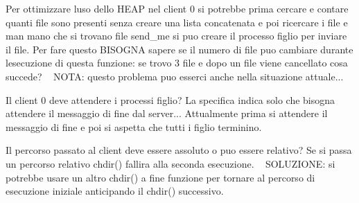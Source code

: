 
\begin{DoxyRefList}
\item[\label{warning__warning000001}%
\Hypertarget{warning__warning000001}%
Globale \hyperlink{client_8h_a8c7084a254c7cd640d66e647795ff8f6}{operazioni\+\_\+client0} ()]Per ottimizzare l\textquotesingle{}uso dello H\+E\+AP nel client 0 si potrebbe prima cercare e contare quanti file sono presenti senza creare una lista concatenata e poi ricercare i file e man mano che si trovano file send\+\_\+me si puo\textquotesingle{} creare il processo figlio per inviare il file. Per fare questo B\+I\+S\+O\+G\+NA sapere se il numero di file puo\textquotesingle{} cambiare durante l\textquotesingle{}esecuzione di questa funzione\+: se trovo 3 file e dopo un file viene cancellato cosa succede? ~\newline
 N\+O\+TA\+: questo problema puo\textquotesingle{} esserci anche nella situazione attuale...

Il client 0 deve attendere i processi figlio? La specifica indica solo che bisogna attendere il messaggio di fine dal server... Attualmente prima si attendere il messaggio di fine e poi si aspetta che tutti i figlio terminino.

Il percorso passato al client deve essere assoluto o puo\textquotesingle{} essere relativo? Se si passa un percorso relativo chdir() fallira\textquotesingle{} alla seconda esecuzione. ~\newline
 S\+O\+L\+U\+Z\+I\+O\+NE\+: si potrebbe usare un altro chdir() a fine funzione per tornare al percorso di esecuzione iniziale anticipando il chdir() successivo.
\end{DoxyRefList}